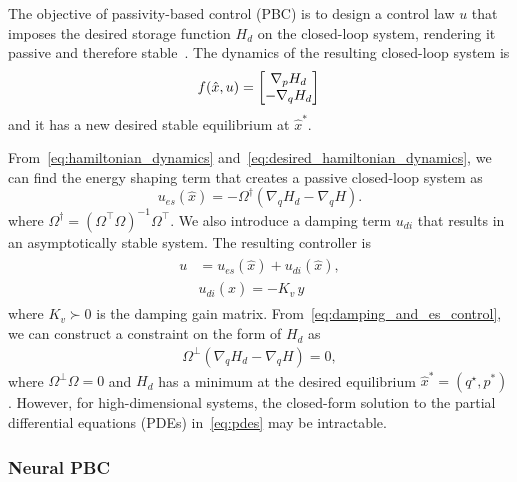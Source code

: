 The objective of passivity-based control (PBC) is to design a control law $u$
that imposes the desired storage function $H_d$ on the closed-loop system,
rendering it passive and therefore stable~\cite{van2000l2}.
%
The dynamics of the resulting closed-loop system is 
\begin{align}
  \begin{split}  
    f(\hat{x}, u) &= \begin{bmatrix}\nabla_pH_d \\ -\nabla_qH_d\end{bmatrix}\, \\
  \end{split}
  \label{eq:desired_hamiltonian_dynamics}
\end{align}
\noindent and it has a new desired stable equilibrium at $\hat{x}^*$.

From~\eqref{eq:hamiltonian_dynamics}
and~\eqref{eq:desired_hamiltonian_dynamics}, we can find the energy shaping term
that creates a passive closed-loop system as
%
\begin{equation}
  u_{es}(\hat{x}) =  -\Omega^{\dagger} \left( \nabla_q H_d - \nabla_q H \right).
  \label{eq:esc}
\end{equation}
\noindent where $\Omega^\dagger = \left( \Omega^\top \Omega  \right)^{-1}
\Omega^\top$. We also introduce a damping term $u_{di}$ that results in an
asymptotically stable system. The resulting controller is
\begin{align}
  \begin{split} 
    u &= u_{es}(\hat{x}) + u_{di}(\hat{x}), \\
    &u_{di}(\hat{x}) = - K_{v} \, y
  \end{split}
  \label{eq:damping_and_es_control}
\end{align}
\noindent where $K_v \succ 0$ is the damping gain matrix.
From~\eqref{eq:damping_and_es_control}, we can construct a constraint on the
form of $H_d$ as 
\begin{align}
  \Omega^\bot \left( \nabla_q H_d - \nabla_q H \right) = 0,
    \label{eq:pdes}
\end{align}
where $\Omega^\perp \Omega = 0$ and $H_d$ has a minimum at the desired
equilibrium $\hat{x}^* = (q^\star, p^*)$. 
%
However, for high-dimensional systems, the closed-form solution to the partial
differential equations (PDEs) in~\eqref{eq:pdes} may be intractable. 

\subsubsection{Neural PBC}

